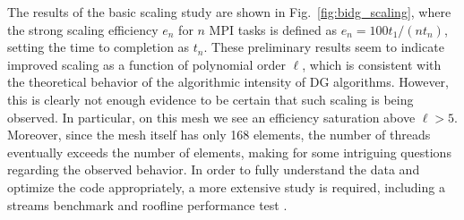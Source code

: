 The results of the basic scaling study are shown in
Fig.~\ref{fig:bidg_scaling}, where the strong scaling efficiency $e_{n}$ for
$n$ MPI tasks is defined as $e_{n}=100t_{1}/(nt_{n})$, setting the time to
completion as $t_n$. These preliminary results seem to indicate improved scaling as a
function of polynomial order $\ell$, which is consistent with the theoretical
behavior of the algorithmic intensity of DG algorithms.  However, this is
clearly not enough evidence to be certain that such scaling is being observed.
In particular, on this mesh we see an efficiency saturation above $\ell>5$.
Moreover, since the mesh itself has only 168 elements, the number of threads
eventually exceeds the number of elements, making for some intriguing questions
regarding the observed behavior.  In order to fully understand the data and
optimize the code appropriately, a more extensive study is required, including
a streams
%
benchmark \cite{McCalpin1995} and roofline performance test
\cite{Williams:2009:RIV:1498765.1498785}.

%
%




